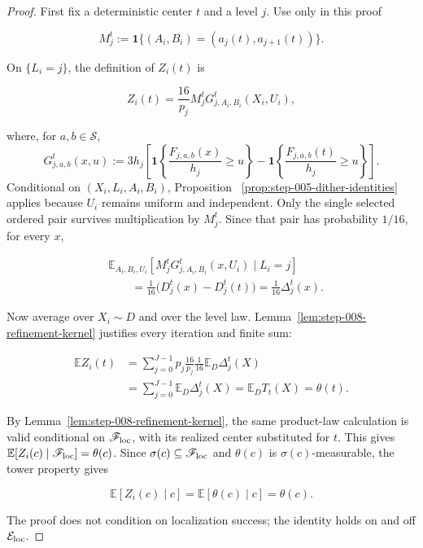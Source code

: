 \begin{proof}
First fix a deterministic center \(t\) and a level \(j\). Use only in this proof

\[
M_j^t
:=\mathbf1\{(A_i,B_i)=(a_j(t),a_{j+1}(t))\}.
\]

On \(\{L_i=j\}\), the definition of \(Z_i(t)\) is

\[
Z_i(t)
=\frac{16}{p_j}M_j^t
G_{j,A_i,B_i}^t(X_i,U_i),
\]

where, for \(a,b\in\mathcal S\),
\[
G_{j,a,b}^t(x,u)
:=3h_j\left[
\mathbf1\!\left\{\frac{F_{j,a,b}(x)}{h_j}\geq u\right\}
-\mathbf1\!\left\{\frac{F_{j,a,b}(t)}{h_j}\geq u\right\}
\right].
\]
Conditional on \((X_i,L_i,A_i,B_i)\), Proposition~
\ref{prop:step-005-dither-identities} applies because \(U_i\) remains
uniform and independent. Only the single selected ordered pair survives
multiplication by \(M_j^t\). Since that pair has probability \(1/16\), for
every \(x\),

\[
\begin{aligned}
&\mathbb E_{A_i,B_i,U_i}\!\left[
M_j^tG_{j,A_i,B_i}^t(x,U_i)
\mid L_i=j\right]\\
&\qquad=\frac1{16}
\bigl(D_j^t(x)-D_j^t(t)\bigr)
=\frac1{16}\Delta_j^t(x).
\end{aligned}
\]

Now average over \(X_i\sim D\) and over the level law. Lemma~\ref{lem:step-008-refinement-kernel} justifies every iteration and finite sum:

\[
\begin{aligned}
\mathbb E Z_i(t)
&=\sum_{j=0}^{J-1}
p_j\frac{16}{p_j}\frac1{16}
\mathbb E_D\Delta_j^t(X)\\
&=\sum_{j=0}^{J-1}\mathbb E_D\Delta_j^t(X)
=\mathbb E_DT_t(X)
=\theta(t).
\end{aligned}
\]

By Lemma~\ref{lem:step-008-refinement-kernel}, the same product-law calculation is valid conditional on \(\mathscr F_{\rm loc}\), with its realized center substituted for \(t\). This gives \(\mathbb E[Z_i(c)\mid\mathscr F_{\rm loc}]=\theta(c)\). Since \(\sigma(c)\subseteq\mathscr F_{\rm loc}\) and \(\theta(c)\) is \(\sigma(c)\)-measurable, the tower property gives

\[
\mathbb E[Z_i(c)\mid c]
=\mathbb E[\theta(c)\mid c]
=\theta(c).
\]

The proof does not condition on localization success; the identity holds on and off \(\mathcal E_{\rm loc}\).
\end{proof}

